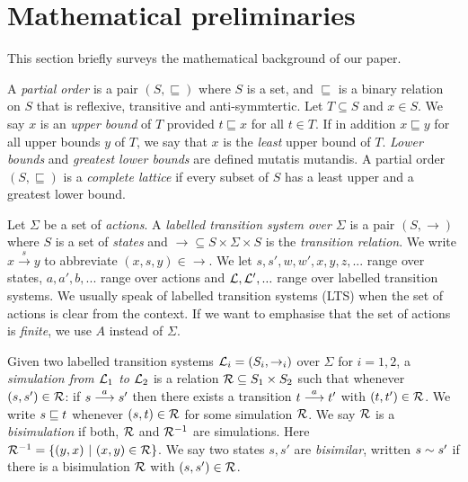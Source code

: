 \section{Mathematical preliminaries}\label{preliminaries}

\NI This section briefly surveys the mathematical background of our
paper.

\begin{definition}
A \emph{partial order} is a pair $(S, \sqsubseteq)$ where $S$ is a
set, and $\sqsubseteq$ is a binary relation on $S$ that is reflexive,
transitive and anti-symmtertic.  Let $T \subseteq S$ and $x \in S$. We
say $x$ is an \emph{upper bound} of $T$ provided $t \sqsubseteq x$ for
all $t \in T$. If in addition $x \sqsubseteq y$ for all upper bounds
$y$ of $T$, we say that $x$ is the \emph{least} upper bound of
$T$. \emph{Lower bounds} and \emph{greatest lower bounds} are defined
mutatis mutandis.  A partial order $(S, \sqsubseteq)$ is a
\emph{complete lattice} if every subset of $S$ has a least upper and a
greatest lower bound. 
\end{definition}

\begin{definition}
Let $\Sigma$ be a set of \emph{actions}.  A \emph{labelled transition
  system over $\Sigma$} is a pair $(S, \rightarrow)$ where $S$ is a
set of \emph{states} and $\rightarrow \subseteq S \times \Sigma \times
S$ is the \emph{transition relation}.  We write $x \xrightarrow{s} y$
to abbreviate $(x,s,y) \in \rightarrow$. We let $s, s', w, w', x, y,
z, ...$ range over states, $a, a', b, ...$ range over actions and
$\mathcal{L}, \mathcal{L}', ...$ range over labelled transition systems. We usually
speak of labelled transition systems (LTS) when the set of actions is
clear from the context. If we want to emphasise that the set of
actions is \emph{finite}, we use $A$ instead of $\Sigma$.
\end{definition}

\begin{definition}
Given two labelled transition systems $\mathcal{L}_i = (S_i, \rightarrow_i)$
over $\Sigma$ for $i = 1, 2$, a \emph{simulation from $\mathcal{L}_1$ to
  $\mathcal{L}_2$} is a relation $\mathcal{R} \subseteq S_1 \times S_2$ such that
whenever $(s, s') \in \mathcal{R}$: if $s \stackrel{a}{\longrightarrow} s'$ then there exists a
transition $t \stackrel{a}{\longrightarrow} t'$ with $(t, t') \in \mathcal{R}$.  We write $s \sqsubseteq
t$ whenever $(s, t) \in \mathcal{R}$ for some simulation $\mathcal{R}$.  We say
$\mathcal{R}$ is a \emph{bisimulation} if both, $\mathcal{R}$ and $\mathcal{R}^{-1}$ are
simulations. Here $\mathcal{R}^{-1} = \{(y, x)\ |\ (x, y) \in \mathcal{R}\}$.  We
say two states $s, s'$ are \emph{bisimilar}, written $s \sim s'$ if
there is a bisimulation $\mathcal{R}$ with $(s, s') \in \mathcal{R}$.
\end{definition}

